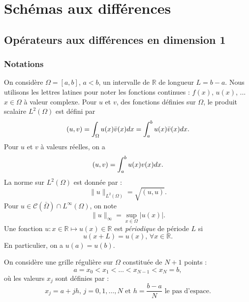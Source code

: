 \chapter{Schémas aux différences}
\label{chap:1}

\section{Opérateurs aux différences en dimension 1}

\subsection{Notations}
\label{sec:notation_1D}

On considère $\Omega = [a,b]$, $a<b$, un intervalle de $\mathbb{R}$ de longueur $L=b-a$. Nous utilisons les lettres latines pour noter les fonctions continues : $f(x)$, $u(x)$, ... $x \in \Omega$ à valeur complexe. Pour $u$ et $v$, des fonctions définies sur $\Omega$, le produit scalaire $L^2 ( \Omega )$ est défini par
\begin{equation}
(u,v) = \displaystyle\int_{\Omega} u(x) \bar{v}(x) dx = \displaystyle\int_{a}^b u(x) \bar{v}(x) dx.
\end{equation}
Pour $u$ et $v$ à valeurs réelles, on a
\begin{equation}
(u,v) = \displaystyle\int_{a}^b u(x) v(x) dx.
\end{equation}
La norme sur $L^2(\Omega)$ est donnée par :
\begin{equation}
\| u \|_{L^2(\Omega)} = \sqrt{(u,u)}.
\end{equation}
Pour $u \in \mathcal
C(\bar{\Omega}) \cap L^{\infty}(\Omega)$, on note
\begin{equation}
\| u \|_{\infty} = \sup_{x\in\Omega} |u(x)|.
\end{equation}
Une fonction $u : x \in \mathbb{R} \mapsto u(x) \in \mathbb{R}$ est \textit{périodique} de période $L$ si 
\begin{equation}
u(x+L) = u(x) \text{, } \forall x \in \mathbb{R}.
\end{equation}
En particulier, on a $u(a)=u(b)$.

On considère une grille régulière sur $\Omega$ constituée de $N + 1$ points :
\begin{equation}
a=x_0 < x_1 < \ldots < x_{N-1} < x_N = b,
\end{equation}
où les valeurs $x_j$ sont définies par :
\begin{equation}
x_j = a + j h\text{, } j = 0,1, \ldots,N \text{ et } h = \dfrac{b-a}{N} \text{ le pas d'espace}. 
\end{equation}

